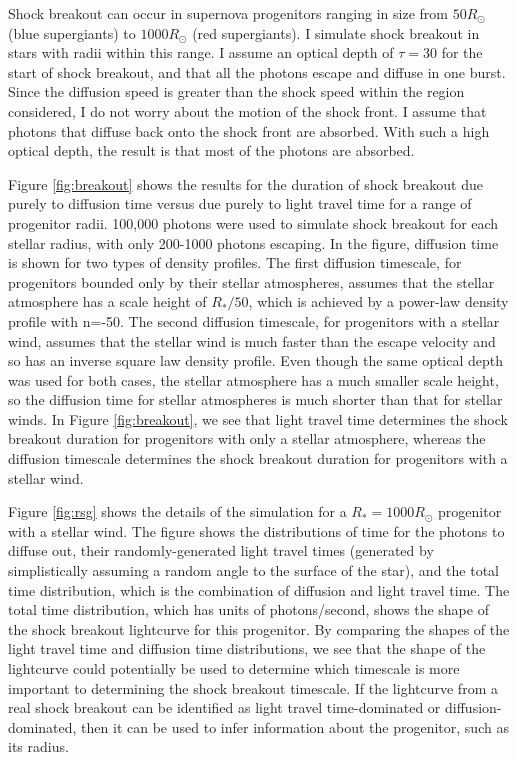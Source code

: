 \documentclass{amsart}
\begin{document}
Shock breakout can occur in supernova progenitors ranging in size from $50R_\odot$ (blue supergiants) to $1000R_\odot$ (red supergiants).  I simulate shock breakout in stars with radii within this range.  I assume an optical depth of $\tau=30$ for the start of shock breakout, and that all the photons escape and diffuse in one burst.  Since the diffusion speed is greater than the shock speed within the region considered, I do not worry about the motion of the shock front.  I assume that photons that diffuse back onto the shock front are absorbed.  With such a high optical depth, the result is that most of the photons are absorbed.

Figure \ref{fig:breakout} shows the results for the duration of shock breakout due purely to diffusion time versus due purely to light travel time for a range of progenitor radii.  100,000 photons were used to simulate shock breakout for each stellar radius, with only 200-1000 photons escaping.  In the figure, diffusion time is shown for two types of density profiles.  The first diffusion timescale, for progenitors bounded only by their stellar atmospheres, assumes that the stellar atmosphere has a scale height of $R_*/50$, which is achieved by a power-law density profile with n=-50.  The second diffusion timescale, for progenitors with a stellar wind, assumes that the stellar wind is much faster than the escape velocity and so has an inverse square law density profile.  Even though the same optical depth was used for both cases, the stellar atmosphere has a much smaller scale height, so the diffusion time for stellar atmospheres is much shorter than that for stellar winds.  In Figure \ref{fig:breakout}, we see that light travel time determines the shock breakout duration for progenitors with only a stellar atmosphere, whereas the diffusion timescale determines the shock breakout duration for progenitors with a stellar wind. 

Figure \ref{fig:rsg} shows the details of the simulation for a $R_*=1000R_\odot$ progenitor with a stellar wind.  The figure shows the distributions of time for the photons to diffuse out, their randomly-generated light travel times (generated by simplistically assuming a random angle to the surface of the star), and the total time distribution, which is the combination of diffusion and light travel time.  The total time distribution, which has units of photons/second, shows the shape of the shock breakout lightcurve for this progenitor.  By comparing the shapes of the light travel time and diffusion time distributions, we see that the shape of the lightcurve could potentially be used to determine which timescale is more important to determining the shock breakout timescale.  If the lightcurve from a real shock breakout can be identified as light travel time-dominated or diffusion-dominated, then it can be used to infer information about the progenitor, such as its radius.
\end{document}
